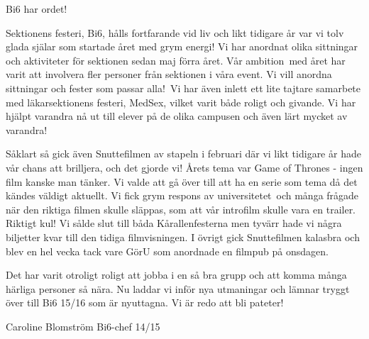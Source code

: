 Bi6 har ordet!

Sektionens festeri, Bi6, hålls fortfarande vid liv och likt tidigare
år var vi tolv glada själar som startade året med grym energi! Vi har
anordnat olika sittningar och aktiviteter för sektionen sedan maj
förra året. Vår ambition med året har varit att involvera fler
personer från sektionen i våra event. Vi vill anordna sittningar och
fester som passar alla! Vi har även inlett ett lite tajtare samarbete
med läkarsektionens festeri, MedSex, vilket varit både roligt och
givande. Vi har hjälpt varandra nå ut till elever på de olika campusen
och även lärt mycket av varandra!

Såklart så gick även Snuttefilmen av stapeln i februari där vi likt
tidigare år hade vår chans att brilljera, och det gjorde vi! Årets
tema var Game of Thrones - ingen film kanske man tänker. Vi valde att
gå över till att ha en serie som tema då det kändes väldigt
aktuellt. Vi fick grym respons av universitetet och många frågade när
den riktiga filmen skulle släppas, som att vår introfilm skulle vara
en trailer. Riktigt kul! Vi sålde slut till båda Kårallenfesterna men
tyvärr hade vi några biljetter kvar till den tidiga filmvisningen. I
övrigt gick Snuttefilmen kalasbra och blev en hel vecka tack vare GörU
som anordnade en filmpub på onsdagen.

Det har varit otroligt roligt att jobba i en så bra grupp och att
komma många härliga personer så nära. Nu laddar vi inför nya
utmaningar och lämnar tryggt över till Bi6 15/16 som är nyuttagna.  Vi
är redo att bli pateter!

Caroline Blomström
Bi6-chef 14/15
